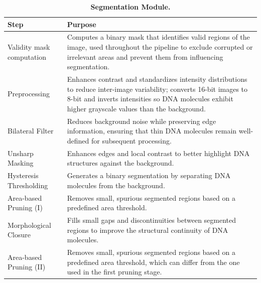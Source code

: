 \begin{table}[H]
\centering
\caption{\textbf{Segmentation Module.}}
\begin{tabular}{|l|p{8cm}|}
\hline
\textbf{Step} & \textbf{Purpose} \\
\hline
Validity mask computation & Computes a binary mask that identifies valid regions of the image, used throughout the pipeline to exclude corrupted or irrelevant areas and prevent them from influencing segmentation. \\
\hline
Preprocessing & Enhances contrast and standardizes intensity distributions to reduce inter-image variability; converts 16-bit images to 8-bit and inverts intensities so DNA molecules exhibit higher grayscale values than the background. \\
\hline
Bilateral Filter & Reduces background noise while preserving edge information, ensuring that thin DNA molecules remain well-defined for subsequent processing. \\
\hline
Unsharp Masking & Enhances edges and local contrast to better highlight DNA structures against the background. \\
\hline
Hysteresis Thresholding & Generates a binary segmentation by separating DNA molecules from the background. \\
\hline
Area-based Pruning (I) & Removes small, spurious segmented regions based on a predefined area threshold. \\
\hline
Morphological Closure & Fills small gaps and discontinuities between segmented regions to improve the structural continuity of DNA molecules. \\
\hline
Area-based Pruning (II) & Removes small, spurious segmented regions based on a predefined area threshold, which can differ from the one used in the first pruning stage. \\
\hline
\end{tabular}
\label{tab:segmentation_pipeline}
\end{table}